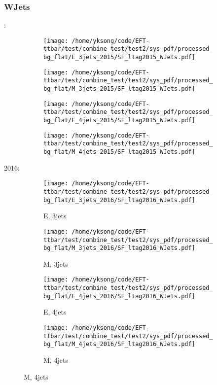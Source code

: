 \documentclass{beamer}
\begin{document}
\begin{frame}
\frametitle{WJets}
\fontsize{5}{1}:
\begin{figure}
\centering
\begin{subfigure}[b]{0.24\textwidth}
\texttt{[image: /home/yksong/code/EFT-ttbar/test/combine\_test/test2/sys\_pdf/processed\_bg\_flat/E\_3jets\_2015/SF\_ltag2015\_WJets.pdf]}
\end{subfigure}
\begin{subfigure}[b]{0.24\textwidth}
\texttt{[image: /home/yksong/code/EFT-ttbar/test/combine\_test/test2/sys\_pdf/processed\_bg\_flat/M\_3jets\_2015/SF\_ltag2015\_WJets.pdf]}
\end{subfigure}
\begin{subfigure}[b]{0.24\textwidth}
\texttt{[image: /home/yksong/code/EFT-ttbar/test/combine\_test/test2/sys\_pdf/processed\_bg\_flat/E\_4jets\_2015/SF\_ltag2015\_WJets.pdf]}
\end{subfigure}
\begin{subfigure}[b]{0.24\textwidth}
\texttt{[image: /home/yksong/code/EFT-ttbar/test/combine\_test/test2/sys\_pdf/processed\_bg\_flat/M\_4jets\_2015/SF\_ltag2015\_WJets.pdf]}
\end{subfigure}
\end{figure}
2016:
\begin{figure}
\centering
\begin{subfigure}[b]{0.24\textwidth}
\texttt{[image: /home/yksong/code/EFT-ttbar/test/combine\_test/test2/sys\_pdf/processed\_bg\_flat/E\_3jets\_2016/SF\_ltag2016\_WJets.pdf]}
\captionsetup{font=tiny}
\caption{E, 3jets}
\end{subfigure}
\begin{subfigure}[b]{0.24\textwidth}
\texttt{[image: /home/yksong/code/EFT-ttbar/test/combine\_test/test2/sys\_pdf/processed\_bg\_flat/M\_3jets\_2016/SF\_ltag2016\_WJets.pdf]}
\captionsetup{font=tiny}
\caption{M, 3jets}
\end{subfigure}
\begin{subfigure}[b]{0.24\textwidth}
\texttt{[image: /home/yksong/code/EFT-ttbar/test/combine\_test/test2/sys\_pdf/processed\_bg\_flat/E\_4jets\_2016/SF\_ltag2016\_WJets.pdf]}
\captionsetup{font=tiny}
\caption{E, 4jets}
\end{subfigure}
\begin{subfigure}[b]{0.24\textwidth}
\texttt{[image: /home/yksong/code/EFT-ttbar/test/combine\_test/test2/sys\_pdf/processed\_bg\_flat/M\_4jets\_2016/SF\_ltag2016\_WJets.pdf]}
\captionsetup{font=tiny}
\caption{M, 4jets}
\end{subfigure}
\end{figure}
\end{frame}
\end{document}
